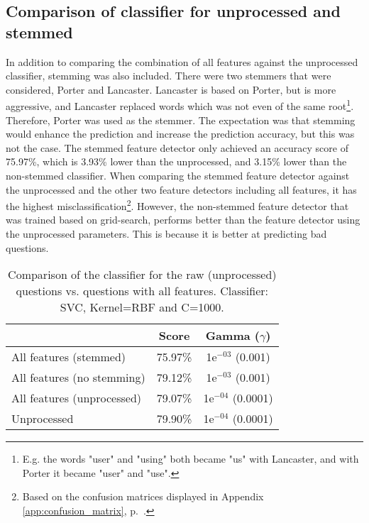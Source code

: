 \subsection{Comparison of classifier for unprocessed and stemmed}
\label{sec:comparing_unprocessed_all_features}
In addition to comparing the combination of all features against the unprocessed classifier, stemming was also included. 
There were two stemmers that were considered, Porter and Lancaster.
Lancaster is based on Porter, but is more aggressive, and Lancaster replaced words which was not even of the same root\footnote{
	E.g. the words "user" and "using" both became "us" with Lancaster, and with Porter it became "user" and "use".
}.
Therefore, Porter was used as the stemmer.
\vspace{0.5em}\newline
The expectation was that stemming would enhance the prediction and increase the prediction accuracy, but this was not the case. 
The stemmed feature detector only achieved an accuracy score of 75.97\%, which is 3.93\% lower than the unprocessed, and 3.15\% lower than the non-stemmed classifier.
When comparing the stemmed feature detector against the unprocessed and the other two feature detectors including all features, it has the highest misclassification\footnote{ 
	Based on the confusion matrices displayed in Appendix \ref{app:confusion_matrix}, p.~\pageref{app:confusion_matrix}.
}.
However, the non-stemmed feature detector that was trained based on grid-search, performs better than the feature detector using the unprocessed parameters.
This is because it is better at predicting bad questions.


\begin{table}[!h]%
	\centering
	\begin{tabular}{| l | c | c |}
		\hline
		~ 							& Score		& Gamma ($\gamma$)		\\ \hline
		All features (stemmed)		& 75.97\%	& 1e$^{-03}$ (0.001)	\\ \hline
		All features (no stemming)	& 79.12\%	& 1e$^{-03}$ (0.001)	\\ \hline
		All features (unprocessed)	& 79.07\%	& 1e$^{-04}$ (0.0001)	\\ \hline
		Unprocessed					& 79.90\%	& 1e$^{-04}$ (0.0001)	\\ \hline
	\end{tabular}
	\caption{Comparison of the classifier for the raw (unprocessed) questions vs. questions with all features. Classifier: SVC, Kernel=RBF and C=1000.}
	\label{tab:unprocessed_vs_all_feature_detectors_svc_so}
\end{table}











